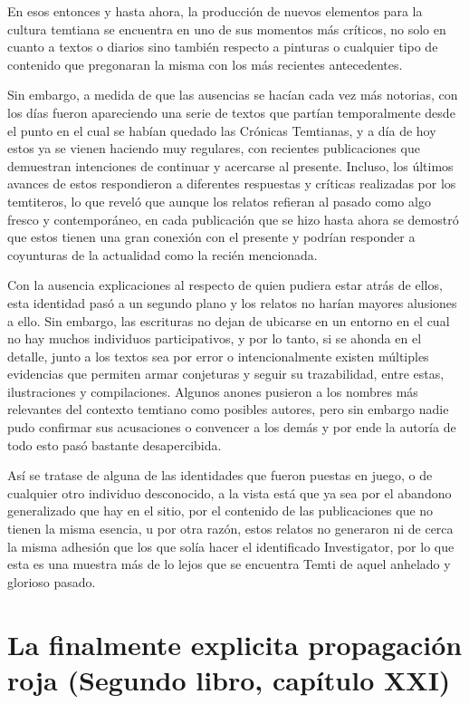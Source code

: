 \documentclass[
]{book}
\begin{document}
En esos entonces y hasta ahora, la producción de nuevos elementos para la cultura temtiana se encuentra en uno de sus momentos más críticos, no solo en cuanto a textos o diarios sino también respecto a pinturas o cualquier tipo de contenido que pregonaran la misma con los más recientes antecedentes.

Sin embargo, a medida de que las ausencias se hacían cada vez más notorias, con los días fueron apareciendo una serie de textos que partían temporalmente desde el punto en el cual se habían quedado las Crónicas Temtianas, y a día de hoy estos ya se vienen haciendo muy regulares, con recientes publicaciones que demuestran intenciones de continuar y acercarse al presente. Incluso, los últimos avances de estos respondieron a diferentes respuestas y críticas realizadas por los temtiteros, lo que reveló que aunque los relatos refieran al pasado como algo fresco y contemporáneo, en cada publicación que se hizo hasta ahora se demostró que estos tienen una gran conexión con el presente y podrían responder a coyunturas de la actualidad como la recién mencionada.

Con la ausencia explicaciones al respecto de quien pudiera estar atrás de ellos, esta identidad pasó a un segundo plano y los relatos no harían mayores alusiones a ello. Sin embargo, las escrituras no dejan de ubicarse en un entorno en el cual no hay muchos individuos participativos, y por lo tanto, si se ahonda en el detalle, junto a los textos sea por error o intencionalmente existen múltiples evidencias que permiten armar conjeturas y seguir su trazabilidad, entre estas, ilustraciones y compilaciones. Algunos anones pusieron a los nombres más relevantes del contexto temtiano como posibles autores, pero sin embargo nadie pudo confirmar sus acusaciones o convencer a los demás y por ende la autoría de todo esto pasó bastante desapercibida.

Así se tratase de alguna de las identidades que fueron puestas en juego, o de cualquier otro individuo desconocido, a la vista está que ya sea por el abandono generalizado que hay en el sitio, por el contenido de las publicaciones que no tienen la misma esencia, u por otra razón, estos relatos no generaron ni de cerca la misma adhesión que los que solía hacer el identificado Investigator, por lo que esta es una muestra más de lo lejos que se encuentra Temti de aquel anhelado y glorioso pasado.

\hypertarget{la-finalmente-explicita-propagaciuxf3n-roja-segundo-libro-capuxedtulo-xxi}{%
\section{La finalmente explicita propagación roja (Segundo libro, capítulo XXI)}\label{la-finalmente-explicita-propagaciuxf3n-roja-segundo-libro-capuxedtulo-xxi}}
\end{document}
